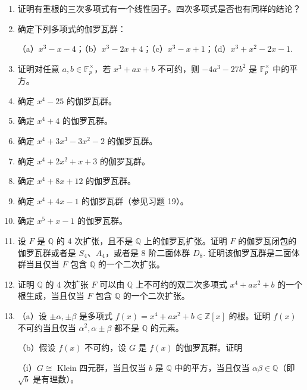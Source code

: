 \begin{enumerate}
\item 证明有重根的三次多项式有一个线性因子。四次多项式是否也有同样的结论？

\item 确定下列多项式的伽罗瓦群：

（a）\(x^3-x-4\)；（b）\(x^3-2x+4\)；（c）\(x^3-x+1\)；（d）\(x^3+x^2-2x-1\).

\item 证明对任意 \(a, b \in \mathbb{F}_p^\times\)，若 \(x^3+ax+b\) 不可约，则 \(-4a^3-27b^2\) 是 \(\mathbb{F}_p^\times\) 中的平方。

\item 确定 \(x^4-25\) 的伽罗瓦群。

\item 确定 \(x^4+4\) 的伽罗瓦群。

\item 确定 \(x^4+3x^3-3x^2-2\) 的伽罗瓦群。

\item 确定 \(x^4+2x^2+x+3\) 的伽罗瓦群。

\item 确定 \(x^4+8x+12\) 的伽罗瓦群。

\item 确定 \(x^4+4x-1\) 的伽罗瓦群（参见习题 19）。

\item 确定 \(x^5+x-1\) 的伽罗瓦群。

\item 设 \(F\) 是 \(\mathbb{Q}\) 的 4 次扩张，且不是 \(\mathbb{Q}\) 上的伽罗瓦扩张。证明 \(F\) 的伽罗瓦闭包的伽罗瓦群或者是 \(S_4\)、\(A_4\)，或者是 8 阶二面体群 \(D_8\). 证明该伽罗瓦群是二面体群当且仅当 \(F\) 包含 \(\mathbb{Q}\) 的一个二次扩张。

\item 证明 \(\mathbb{Q}\) 的 4 次扩张 \(F\) 可以由 \(\mathbb{Q}\) 上不可约的双二次多项式 \(x^4+ax^2+b\) 的一个根生成，当且仅当 \(F\) 包含 \(\mathbb{Q}\) 的一个二次扩张。

\item （a）设 \(\pm\alpha, \pm\beta\) 是多项式 \(f(x) = x^4+ax^2+b \in \mathbb{Z}[x]\) 的根。证明 \(f(x)\) 不可约当且仅当 \(\alpha^2, \alpha\pm\beta\) 都不是 \(\mathbb{Q}\) 的元素。

（b）假设 \(f(x)\) 不可约，设 \(G\) 是 \(f(x)\) 的伽罗瓦群。证明

（i）\(G \cong\) Klein 四元群，当且仅当 \(b\) 是 \(\mathbb{Q}\) 中的平方，当且仅当 \(\alpha\beta \in \mathbb{Q}\)（即 \(\sqrt{b}\) 是有理数）。


\end{enumerate}
